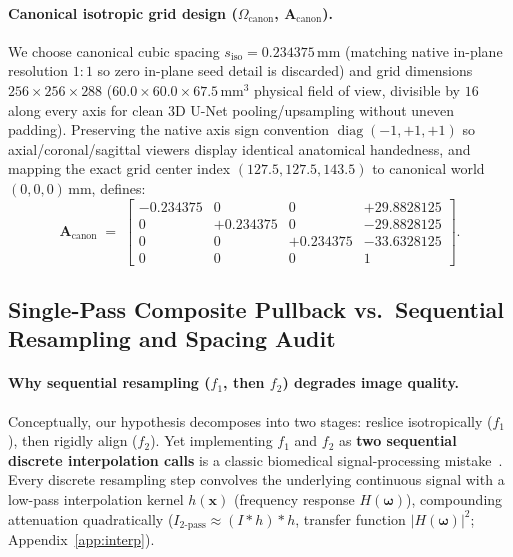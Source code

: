 \documentclass[10pt,a4paper]{article}
\renewcommand{\_}{\origunderscore\allowbreak}
\begin{document}
\paragraph{Canonical isotropic grid design ($\Omega_{\text{canon}}$, $\mathbf{A}_{\text{canon}}$).}
We choose canonical cubic spacing $s_{\text{iso}} = 0.234375\,\text{mm}$ (matching native in-plane resolution $1:1$ so zero in-plane seed detail is discarded) and grid dimensions $256 \times 256 \times 288$ ($60.0 \times 60.0 \times 67.5\,\text{mm}^3$ physical field of view, divisible by $16$ along every axis for clean 3D U-Net pooling/upsampling without uneven padding). Preserving the native axis sign convention $\operatorname{diag}(-1, +1, +1)$ so axial/coronal/sagittal viewers display identical anatomical handedness, and mapping the exact grid center index $(127.5, 127.5, 143.5)$ to canonical world $(0, 0, 0)\,\text{mm}$, defines:
\begin{equation}
    \mathbf{A}_{\text{canon}} \;=\;
    \begin{bmatrix}
        -0.234375 & 0 & 0 & +29.8828125 \\
        0 & +0.234375 & 0 & -29.8828125 \\
        0 & 0 & +0.234375 & -33.6328125 \\
        0 & 0 & 0 & 1
    \end{bmatrix}.
    \label{eq:a_canon}
\end{equation}

\subsection{Single-Pass Composite Pullback vs.\ Sequential Resampling and Spacing Audit}
\label{sec:meth_pullback}

\paragraph{Why sequential resampling ($f_1$, then $f_2$) degrades image quality.}
Conceptually, our hypothesis decomposes into two stages: reslice isotropically ($f_1$), then rigidly align ($f_2$). Yet implementing $f_1$ and $f_2$ as \textbf{two sequential discrete interpolation calls} is a classic biomedical signal-processing mistake~\cite{thevenaz2000interpolation,unser1999splines}. Every discrete resampling step convolves the underlying continuous signal with a low-pass interpolation kernel $h(\mathbf{x})$ (frequency response $H(\boldsymbol{\omega})$), compounding attenuation quadratically ($I_{\text{2-pass}} \approx (I * h) * h$, transfer function $|H(\boldsymbol{\omega})|^2$; Appendix~\ref{app:interp}).
\end{document}

